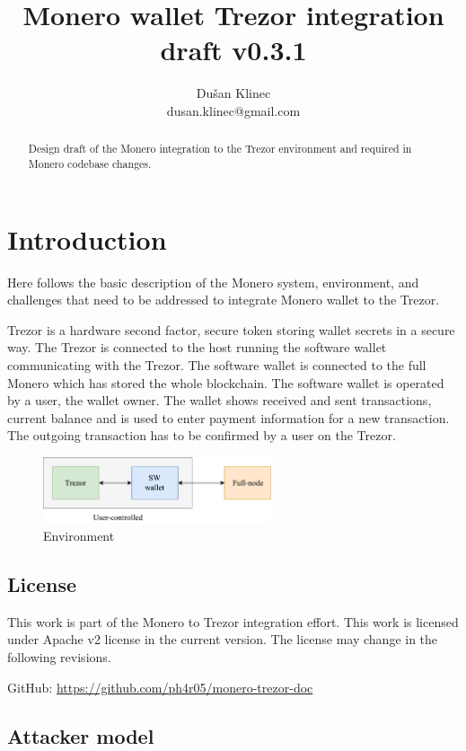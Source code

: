 \documentclass[]{article}
\title{Monero wallet Trezor integration draft v0.3.1}
\author{Du\v{s}an Klinec \\{dusan.klinec@gmail.com}}
\begin{document}
	
\maketitle

\begin{abstract}
	Design draft of the Monero integration to the Trezor environment and required in Monero codebase changes.
\end{abstract}

\section{Introduction}
Here follows the basic description of the Monero system, environment, and challenges that need to be addressed to integrate Monero wallet to the Trezor.

Trezor is a hardware second factor, secure token storing wallet secrets in a secure way. 
The Trezor is connected to the host running the software wallet communicating with the Trezor. The software wallet is connected to the full Monero which has stored the whole blockchain. The software wallet is operated by a user, the wallet owner. The wallet shows received and sent transactions, current balance and is used to enter payment information for a new transaction. The outgoing transaction has to be confirmed by a user on the Trezor.

\begin{figure}[h]
	\centering
	\includegraphics[width=0.6\textwidth, angle=0]{trezord.pdf}
	\caption{Environment}
\end{figure}


\subsection{License}
This work is part of the Monero to Trezor integration effort. This work is licensed under Apache v2 license in the current version. The license may change in the following revisions.

GitHub: \url{https://github.com/ph4r05/monero-trezor-doc} 

\subsection{Attacker model}
\end{document}
